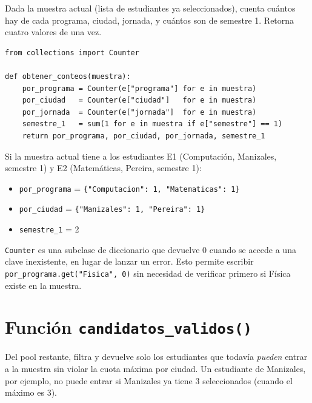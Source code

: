 \documentclass[11pt, a4paper]{article}
\begin{document}
\begin{quehaec}
Dada la muestra actual (lista de estudiantes ya seleccionados), cuenta cuántos hay de cada programa, ciudad, jornada, y cuántos son de semestre 1. Retorna cuatro valores de una vez.
\end{quehaec}

\begin{lstlisting}[style=python]
from collections import Counter

def obtener_conteos(muestra):
    por_programa = Counter(e["programa"] for e in muestra)
    por_ciudad   = Counter(e["ciudad"]   for e in muestra)
    por_jornada  = Counter(e["jornada"]  for e in muestra)
    semestre_1   = sum(1 for e in muestra if e["semestre"] == 1)
    return por_programa, por_ciudad, por_jornada, semestre_1
\end{lstlisting}

\begin{ejemplo}
Si la muestra actual tiene a los estudiantes E1 (Computación, Manizales, semestre 1) y E2 (Matemáticas, Pereira, semestre 1):
\begin{itemize}[noitemsep]
  \item \texttt{por\_programa} = \texttt{\{"Computacion": 1, "Matematicas": 1\}}
  \item \texttt{por\_ciudad}   = \texttt{\{"Manizales": 1, "Pereira": 1\}}
  \item \texttt{semestre\_1}  = 2
\end{itemize}
\end{ejemplo}

\begin{porqueimporta}
\texttt{Counter} es una subclase de diccionario que devuelve 0 cuando se accede a una clave inexistente, en lugar de lanzar un error. Esto permite escribir \texttt{por\_programa.get("Fisica", 0)} sin necesidad de verificar primero si Física existe en la muestra.
\end{porqueimporta}

\section{Función \texttt{candidatos\_validos()}}

\begin{quehaec}
Del pool restante, filtra y devuelve solo los estudiantes que todavía \emph{pueden} entrar a la muestra sin violar la cuota máxima por ciudad. Un estudiante de Manizales, por ejemplo, no puede entrar si Manizales ya tiene 3 seleccionados (cuando el máximo es 3).
\end{quehaec}
\end{document}
